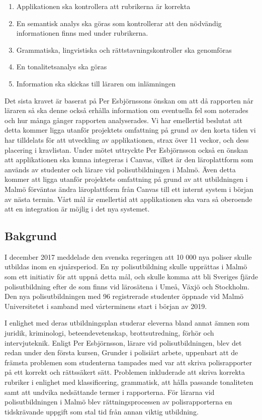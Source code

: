 \documentclass[swedish]{maucsthesis}
\begin{document}
\begin{enumerate}
\item Applikationen ska kontrollera att rubrikerna är korrekta
\item En semantisk analys ska göras som kontrollerar att den nödvändig
  informationen finns med under rubrikerna.
\item Grammatiska, lingvistiska och rättstavningskontroller ska genomföras
\item En tonalitetsanalys ska göras
\item Information ska skickas till läraren om inlämningen    
\end{enumerate}
Det sista kravet är baserat på Per Esbjörnssons önskan om att då rapporten når
läraren så ska denne också erhålla information om eventuella fel som noterades
och hur många gånger rapporten analyserades. Vi har emellertid beslutat att
detta kommer ligga utanför projektets omfattning på grund av den korta tiden vi
har tilldelats för att utveckling av applikationen, strax över 11 veckor, och
dess placering i kravlistan. Under mötet uttryckte Per Esbjörnsson också en
önskan att applikationen ska kunna integreras i Canvas, vilket är den
läroplattform som används av studenter och lärare vid polisutbildningen i Malmö.
Även detta kommer att ligga utanför projektets omfattning på grund av att
utbildningen i Malmö förväntas ändra läroplattform från Canvas till ett internt
system i början av nästa termin. Vårt mål är emellertid att applikationen ska
vara så oberoende att en integration är möjlig i det nya systemet.

\subsection{Bakgrund}
I december 2017 meddelade den svenska regeringen att 10 000 nya poliser skulle
utbildas inom en sjuårsperiod. En ny polisutbildning skulle upprättas i Malmö
som ett initiativ för att uppnå detta mål, och skulle komma att bli Sveriges
fjärde polisutbildning efter de som finns vid lärosätena i Umeå, Växjö och
Stockholm. Den nya polisutbildningen med 96 registrerade studenter öppnade vid
Malmö Universitetet i samband med vårterminens start i början av 2019.

I enlighet med deras utbildningsplan studerar eleverna bland annat ämnen som
juridik, kriminologi, beteendevetenskap, brottsutredning, förhör och
intervjuteknik. Enligt Per Esbjörnsson, lärare vid polisutbildningen, blev det
redan under den första kursen, Grunder i polisiärt arbete, uppenbart att de
främsta problemen som studenterna tampades med var att skriva polisrapporter på
ett korrekt och rättssäkert sätt. Problemen inkluderade att skriva korrekta
rubriker i enlighet med klassificering, grammatisk, att hålla passande
tonaliteten samt att undvika nedsättande termer i rapporterna. För lärarna vid
polisutbildningen i Malmö blev rättningsprocessen av polisrapporterna en
tidskrävande uppgift som stal tid från annan viktig utbildning.
\end{document}
